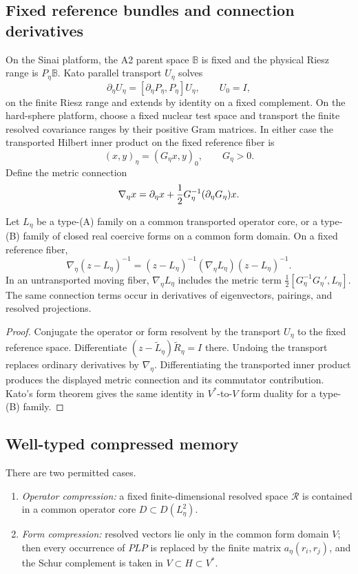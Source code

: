 \subsection{Fixed reference bundles and connection derivatives}

On the Sinai platform, the A2 parent space \(\mathbb B\) is fixed and the
physical Riesz range is \(P_\eta\mathbb B\).  Kato parallel transport
\(U_\eta\) solves
\[
 \partial_\eta U_\eta=[\partial_\eta P_\eta,P_\eta]U_\eta,
 \qquad U_0=I,
\]
on the finite Riesz range and extends by identity on a fixed complement.  On
the hard-sphere platform, choose a fixed nuclear test space and transport the
finite resolved covariance ranges by their positive Gram matrices.  In either
case the transported Hilbert inner product on the fixed reference fiber is
\[
 (x,y)_\eta=(G_\eta x,y)_0,
 \qquad G_\eta>0.
\]
Define the metric connection
\[
 \nabla_\eta x=\partial_\eta x
 +{1\over2}G_\eta^{-1}(\partial_\eta G_\eta)x.
\]

\begin{theorem}
\label{thm:r16-c2-connection}
Let \(L_\eta\) be a type-(A) family on a common transported operator core, or
a type-(B) family of closed real coercive forms on a common form domain.  On a
fixed reference fiber,
\[
 \nabla_\eta(z-L_\eta)^{-1}
 =(z-L_\eta)^{-1}
  (\nabla_\eta L_\eta)(z-L_\eta)^{-1}.
\]
In an untransported moving fiber, \(\nabla_\eta L_\eta\) includes the metric
term \(\tfrac12[G_\eta^{-1}G_\eta',L_\eta]\).  The same connection
terms occur in derivatives of eigenvectors, pairings, and resolved
projections.
\end{theorem}

\begin{proof}
Conjugate the operator or form resolvent by the transport \(U_\eta\) to the
fixed reference space.  Differentiate
\((z-\widetilde L_\eta)\widetilde R_\eta=I\) there.  Undoing the transport
replaces ordinary derivatives by \(\nabla_\eta\).  Differentiating the
transported inner product produces the displayed metric connection and its
commutator contribution.  Kato's form theorem gives the same identity in
\(V^*\)-to-\(V\) form duality for a type-(B) family.
\end{proof}

\subsection{Well-typed compressed memory}

There are two permitted cases.
\begin{enumerate}[label=(\alph*)]
\item \emph{Operator compression:} a fixed finite-dimensional resolved space
\(\mathcal R\) is contained in a common operator core \(D\subset D(L_\eta^2)\).
\item \emph{Form compression:} resolved vectors lie only in the common form
domain \(V\); then every occurrence of \(PLP\) is replaced by the finite
matrix \(a_\eta(r_i,r_j)\), and the Schur complement is taken in
\(V\subset H\subset V^*\).
\end{enumerate}

